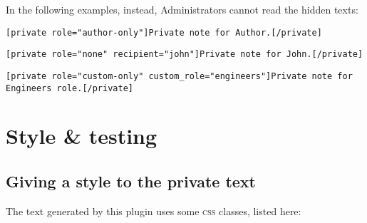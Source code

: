 In the following examples, instead, Administrators cannot read the hidden texts:

\begin{lstlisting}
[private role="author-only"]Private note for Author.[/private]
\end{lstlisting}

\begin{lstlisting}
[private role="none" recipient="john"]Private note for John.[/private]
\end{lstlisting}

\begin{lstlisting}
[private role="custom-only" custom_role="engineers"]Private note for Engineers role.[/private]
\end{lstlisting}

\part{Style \& testing}

\chapter{Giving a style to the private text}

The text generated by this plugin uses some \textsc{css} classes, listed here:

